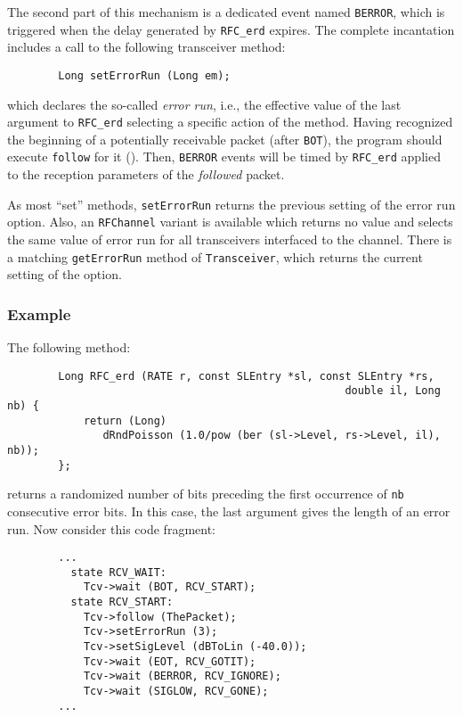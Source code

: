 The second part of this mechanism is a dedicated event named {\tt BERROR},
which is triggered when the delay generated by {\tt RFC\_erd} expires.
The complete incantation includes a call to the following transceiver
method:
\begin{verbatim}
        Long setErrorRun (Long em);
\end{verbatim}
\noindent
which declares the so-called {\em error run}, i.e.,
the effective value of the last argument to {\tt RFC\_erd}
selecting a specific action of the method.
Having recognized the beginning of a potentially receivable packet (after
{\tt BOT}), the program should execute {\tt follow} for it
().
Then, {\tt BERROR} events will be timed by {\tt RFC\_erd} applied to the
reception parameters of the {\em followed\/} packet.

As most ``set'' methods, {\tt setErrorRun} returns the previous setting of
the error run option.
Also, an {\tt RFChannel} variant is available which returns no value and
selects the same value of error run
for all transceivers interfaced to the channel.
There is a matching {\tt getErrorRun} method of {\tt Transceiver}, which
returns the current setting of the option.

\subsubsection*{Example}

The following method:

\begin{verbatim}
        Long RFC_erd (RATE r, const SLEntry *sl, const SLEntry *rs,
                                                     double il, Long nb) {
            return (Long)
               dRndPoisson (1.0/pow (ber (sl->Level, rs->Level, il), nb));
        };
\end{verbatim}
returns a randomized number of bits preceding the first occurrence of {\tt nb}
consecutive error bits.
In this case, the last argument gives the length of an error run.
Now consider this code fragment:

\begin{verbatim}
        ...
          state RCV_WAIT:
            Tcv->wait (BOT, RCV_START);
          state RCV_START:
            Tcv->follow (ThePacket);
            Tcv->setErrorRun (3);
            Tcv->setSigLevel (dBToLin (-40.0));
            Tcv->wait (EOT, RCV_GOTIT);
            Tcv->wait (BERROR, RCV_IGNORE);
            Tcv->wait (SIGLOW, RCV_GONE);
        ...
\end{verbatim}

